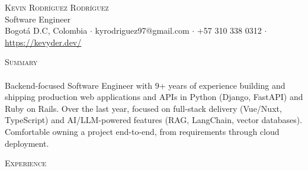 \documentclass[a4paper]{article}
\newcommand{\lineunder} {
    \vspace*{-8pt} \\
    \hspace*{-18pt} \hrulefill \\
}
\newcommand{\header} [1] {
    {\hspace*{-18pt}\vspace*{6pt} \textsc{#1}}
    \vspace*{-6pt} \lineunder
}
\begin{document}
\vspace*{-40pt}



\vspace*{-10pt}
\begin{center}
	{\Huge \scshape {Kevin Rodríguez Rodríguez}}\\
	\vspace*{2pt}
	{\large Software Engineer}\\
	\vspace*{2pt}
	Bogotá D.C, Colombia $\cdot$ kyrodriguez97@gmail.com $\cdot$ +57 310 338 0312 $\cdot$ \url{https://kevyder.dev/}\\
\end{center}

\header{Summary}
\vspace{1mm}
Backend-focused Software Engineer with 9+ years of experience building and shipping production web applications and APIs in Python (Django, FastAPI) and Ruby on Rails. Over the last year, focused on full-stack delivery (Vue/Nuxt, TypeScript) and AI/LLM-powered features (RAG, LangChain, vector databases). Comfortable owning a project end-to-end, from requirements through cloud deployment.

\header{Experience}
\vspace{1mm}
\end{document}
